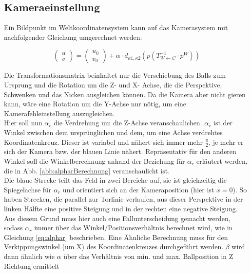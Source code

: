 \documentclass{ezb}
\begin{document}
\subsection{Kameraeinstellung}\label{b:kam}
Ein Bildpunkt im Weltkoordinatensystem kann auf das Kamerasystem mit nachfolgender Gleichung umgerechnet werden:\\
\begin{small}
\begin{equation}
\left(
\begin{array}{c}
      u \\
      v
\end{array}
\right)
=
\left(
\begin{array}{c}
      u_{0} \\
      v_{0}
\end{array}   
\right)
+ \alpha \cdot d_{\kappa1 ,\kappa2}(p(T^{-1}_{W\leftarrow C}\cdot p^{W})) 
\label{eq:Kameragleichung}
\end{equation}
\end{small}
Die Transformationsmatrix beinhaltet nur die Verschiebung des Balls zum Ursprung und die Rotation um die Z- und X- Achse, die die Perspektive, Schwenken und das Nicken ausgleichen können. Da die Kamera aber nicht gieren kann, wäre eine Rotation um die Y-Achse nur nötig, um eine Kamerafehleinstellung auszugleichen.\\
\linebreak
Hier soll nun $\alpha_{r}$ die Verdrehung um die Z-Achse veranschaulichen. $\alpha_{r}$ ist der Winkel zwischen dem ursprünglichen und dem, um eine Achse verdrehtes Koordinatenkreuz. Dieser ist variabel und nähert sich immer mehr $\frac{\pi}{2}$, je mehr er sich der Kamera bzw. der blauen Linie nähert. Repräsentativ für den anderen Winkel soll die Winkelberechnung anhand der Beziehung für $\alpha_{r}$ erläutert werden, die in Abb. \ref{abb:alpharBerechnung} veranschaulicht ist.\\
\linebreak
Die blaue Strecke teilt das Feld in zwei Bereiche auf, sie ist gleichzeitig die Spiegelachse für $\alpha_{r}$ und orientiert sich an der Kameraposition (hier ist $x=0$). So haben Strecken, die parallel zur Torlinie verlaufen, aus dieser Perspektive in der linken Hälfte eine positive Steigung und in der rechten eine negative Steigung. Aus diesem Grund muss hier auch eine Fallunterscheidung gemacht werden, sodass $\alpha_{r}$ immer über das Winkel/Positionsverhältnis berechnet wird, wie in Gleichung \ref{eq:alphar} beschrieben. Eine Ähnliche Berechnung muss für den Verkippungswinkel (um X) des Koordinatenkreuzes durchgeführt werden. $\beta$ wird dann ähnlich wie $\alpha$ über das Verhältnis von min. und max. Ballposition in Z Richtung ermittelt\\
\end{document}
